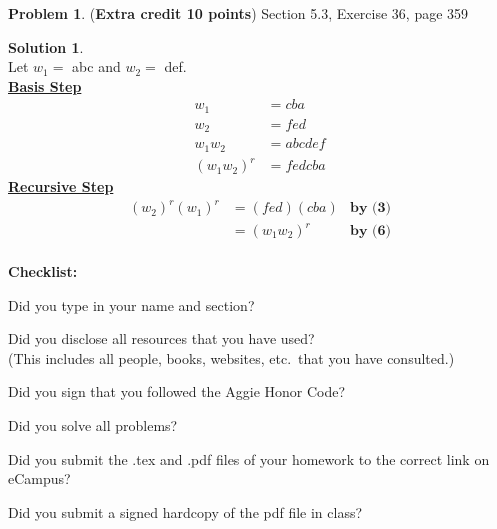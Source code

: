 \documentclass{article}
\theoremstyle{definition}
\newtheorem{problem}{Problem}
\newtheorem*{solution}{Solution}
\newcommand{\checklist}{\noindent\textbf{Checklist:}
\begin{compactitem}[$\Box$] 
\item Did you type in your name and section? 
\item Did you disclose all resources that you have used? \\
(This includes all people, books, websites, etc.\ that you have consulted.)
\item Did you sign that you followed the Aggie Honor Code? 
\item Did you solve all problems? 
\item Did you submit the .tex and .pdf files of your homework to the correct link on eCampus?
\item Did you submit a signed hardcopy of the pdf file in class? 
\end{compactitem}
}
\begin{document}
\begin{problem} (\textbf{Extra credit 10 points})
Section 5.3, Exercise 36, page 359
\end{problem}
\begin{solution} \ \\
Let $w_1 =$ abc and $w_2 =$ def. \\
\textbf{\underline{Basis Step}} \\
\begin{align}
  w_1 &= cba \\
  w_2 &= fed \\
  w_1 w_2 &= abc def \\
  (w_1 w_2)^r &= fedcba
\end{align}
\textbf{\underline{Recursive Step}} \\
\begin{align*}
  (w_2)^r (w_1)^r &= (fed) (cba) &\textbf{by (3)} \\
  &= (w_1w_2)^r &\textbf{by (6)} \\
\end{align*}
\end{solution}

\goodbreak
\checklist
\end{document}
